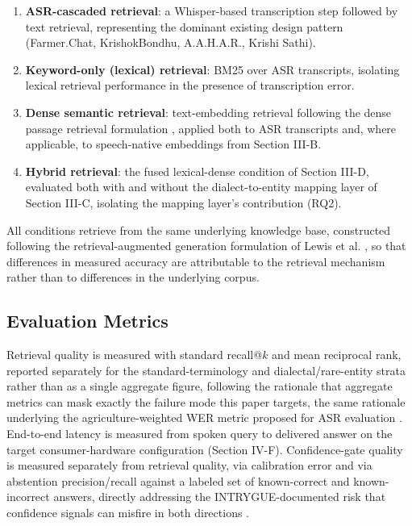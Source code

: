 \documentclass[conference]{IEEEtran}
\begin{document}
\begin{enumerate}
    \item \textbf{ASR-cascaded retrieval}: a Whisper-based \cite{radford2023whisper} transcription step followed by text retrieval, representing the dominant existing design pattern (Farmer.Chat, KrishokBondhu, A.A.H.A.R., Krishi Sathi).
    \item \textbf{Keyword-only (lexical) retrieval}: BM25 over ASR transcripts, isolating lexical retrieval performance in the presence of transcription error.
    \item \textbf{Dense semantic retrieval}: text-embedding retrieval following the dense passage retrieval formulation \cite{karpukhin2020dpr}, applied both to ASR transcripts and, where applicable, to speech-native embeddings from Section III-B.
    \item \textbf{Hybrid retrieval}: the fused lexical-dense condition of Section III-D, evaluated both with and without the dialect-to-entity mapping layer of Section III-C, isolating the mapping layer's contribution (RQ2).
\end{enumerate}

All conditions retrieve from the same underlying knowledge base, constructed following the retrieval-augmented generation formulation of Lewis et al. \cite{lewis2020rag}, so that differences in measured accuracy are attributable to the retrieval mechanism rather than to differences in the underlying corpus.

\subsection{Evaluation Metrics}
Retrieval quality is measured with standard recall@$k$ and mean reciprocal rank, reported separately for the standard-terminology and dialectal/rare-entity strata rather than as a single aggregate figure, following the rationale that aggregate metrics can mask exactly the failure mode this paper targets, the same rationale underlying the agriculture-weighted WER metric proposed for ASR evaluation \cite{benchmarkingasr2026}. End-to-end latency is measured from spoken query to delivered answer on the target consumer-hardware configuration (Section IV-F). Confidence-gate quality is measured separately from retrieval quality, via calibration error and via abstention precision/recall against a labeled set of known-correct and known-incorrect answers, directly addressing the INTRYGUE-documented risk that confidence signals can misfire in both directions \cite{intrygue2026}.
\end{document}
